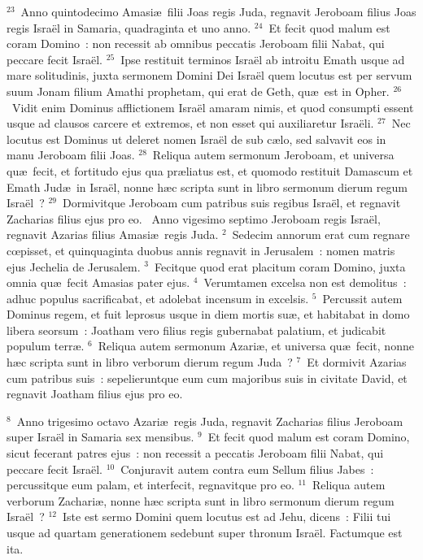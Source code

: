 ${}^{23}$~Anno quintodecimo Amasi\ae\ filii Joas regis Juda, regnavit Jeroboam filius Joas regis Isra\"el in Samaria, quadraginta et uno anno.
${}^{24}$~Et fecit quod malum est coram Domino~: non recessit ab omnibus peccatis Jeroboam filii Nabat, qui peccare fecit Isra\"el.
${}^{25}$~Ipse restituit terminos Isra\"el ab introitu Emath usque ad mare solitudinis, juxta sermonem Domini Dei Isra\"el quem locutus est per servum suum Jonam filium Amathi prophetam, qui erat de Geth, qu\ae\ est in Opher.
${}^{26}$~Vidit enim Dominus afflictionem Isra\"el amaram nimis, et quod consumpti essent usque ad clausos carcere et extremos, et non esset qui auxiliaretur Isra\"eli.
${}^{27}$~Nec locutus est Dominus ut deleret nomen Isra\"el de sub c\ae lo, sed salvavit eos in manu Jeroboam filii Joas.
${}^{28}$~Reliqua autem sermonum Jeroboam, et universa qu\ae\ fecit, et fortitudo ejus qua pr\ae liatus est, et quomodo restituit Damascum et Emath Jud\ae\ in Isra\"el, nonne h\ae c scripta sunt in libro sermonum dierum regum Isra\"el~?
${}^{29}$~Dormivitque Jeroboam cum patribus suis regibus Isra\"el, et regnavit Zacharias filius ejus pro eo.
~\lettrine[lines=10,image=true,loversize=0.05,lraise=-0.03]{A}{}nno vigesimo septimo Jeroboam regis Isra\"el, regnavit Azarias filius Amasi\ae\ regis Juda.
${}^{2}$~Sedecim annorum erat cum regnare cœpisset, et quinquaginta duobus annis regnavit in Jerusalem~: nomen matris ejus Jechelia de Jerusalem.
${}^{3}$~Fecitque quod erat placitum coram Domino, juxta omnia qu\ae\ fecit Amasias pater ejus.
${}^{4}$~Verumtamen excelsa non est demolitus~: adhuc populus sacrificabat, et adolebat incensum in excelsis.
${}^{5}$~Percussit autem Dominus regem, et fuit leprosus usque in diem mortis su\ae , et habitabat in domo libera seorsum~: Joatham vero filius regis gubernabat palatium, et judicabit populum terr\ae .
${}^{6}$~Reliqua autem sermonum Azari\ae , et universa qu\ae\ fecit, nonne h\ae c scripta sunt in libro verborum dierum regum Juda~?
${}^{7}$~Et dormivit Azarias cum patribus suis~: sepelieruntque eum cum majoribus suis in civitate David, et regnavit Joatham filius ejus pro eo.


${}^{8}$~Anno trigesimo octavo Azari\ae\ regis Juda, regnavit Zacharias filius Jeroboam super Isra\"el in Samaria sex mensibus.
${}^{9}$~Et fecit quod malum est coram Domino, sicut fecerant patres ejus~: non recessit a peccatis Jeroboam filii Nabat, qui peccare fecit Isra\"el.
${}^{10}$~Conjuravit autem contra eum Sellum filius Jabes~: percussitque eum palam, et interfecit, regnavitque pro eo.
${}^{11}$~Reliqua autem verborum Zachari\ae , nonne h\ae c scripta sunt in libro sermonum dierum regum Isra\"el~?
${}^{12}$~Iste est sermo Domini quem locutus est ad Jehu, dicens~: Filii tui usque ad quartam generationem sedebunt super thronum Isra\"el. Factumque est ita.


